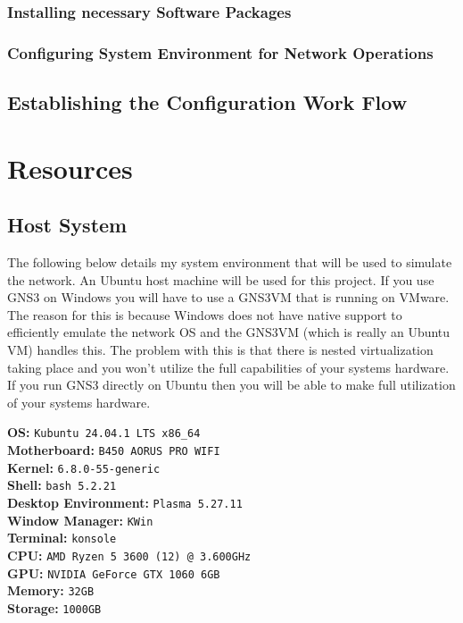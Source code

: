 \documentclass[12pt, letterpaper]{article}
\begin{document}
	\subsubsection{Installing necessary Software Packages}
	
	\subsubsection{Configuring System Environment for Network Operations}

	\subsection{Establishing the Configuration Work Flow}

	
		
		

\newpage

\section{Resources}

	\subsection{Host System}
The following below details my system environment that will be used to simulate the network. An Ubuntu host machine will be used for this project. If you use GNS3 on Windows you will have to use a GNS3VM that is running on VMware. The reason for this is because Windows does not have native support to efficiently emulate the network OS and the GNS3VM (which is really an Ubuntu VM) handles this. The problem with this is that there is nested virtualization taking place and you won’t utilize the full capabilities of your systems hardware. If you run GNS3 directly on Ubuntu then you will be able to make full utilization of your systems hardware.

\smallskip

\textbf{OS:} \texttt{Kubuntu 24.04.1 LTS x86\_64} \\
\textbf{Motherboard:} \texttt{B450 AORUS PRO WIFI} \\ 
\textbf{Kernel:} \texttt{6.8.0-55-generic} \\
\textbf{Shell:} \texttt{bash 5.2.21} \\
\textbf{Desktop Environment:} \texttt{Plasma 5.27.11} \\
\textbf{Window Manager:} \texttt{KWin} \\
\textbf{Terminal:} \texttt{konsole} \\
\textbf{CPU:} \texttt{AMD Ryzen 5 3600 (12) @ 3.600GHz} \\  
\textbf{GPU:} \texttt{NVIDIA GeForce GTX 1060 6GB}  \\
\textbf{Memory:} \texttt{32GB} \\
\textbf{Storage:} \texttt{1000GB}
\end{document}

